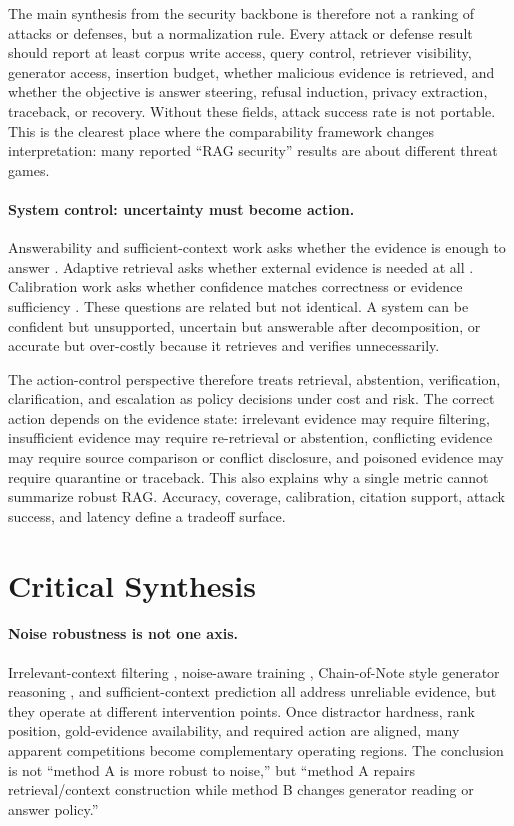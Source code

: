 \documentclass[11pt]{article}
\begin{document}
The main synthesis from the security backbone is therefore not a ranking of attacks or defenses, but a normalization rule. Every attack or defense result should report at least corpus write access, query control, retriever visibility, generator access, insertion budget, whether malicious evidence is retrieved, and whether the objective is answer steering, refusal induction, privacy extraction, traceback, or recovery. Without these fields, attack success rate is not portable. This is the clearest place where the comparability framework changes interpretation: many reported ``RAG security'' results are about different threat games.

\paragraph{System control: uncertainty must become action.}
Answerability and sufficient-context work asks whether the evidence is enough to answer \citep{sufficientContext2024}. Adaptive retrieval asks whether external evidence is needed at all \citep{selfRAG2023,crag2024}. Calibration work asks whether confidence matches correctness or evidence sufficiency \citep{calibRAG2025,uncertaintyRAG2024}. These questions are related but not identical. A system can be confident but unsupported, uncertain but answerable after decomposition, or accurate but over-costly because it retrieves and verifies unnecessarily.

The action-control perspective therefore treats retrieval, abstention, verification, clarification, and escalation as policy decisions under cost and risk. The correct action depends on the evidence state: irrelevant evidence may require filtering, insufficient evidence may require re-retrieval or abstention, conflicting evidence may require source comparison or conflict disclosure, and poisoned evidence may require quarantine or traceback. This also explains why a single metric cannot summarize robust RAG. Accuracy, coverage, calibration, citation support, attack success, and latency define a tradeoff surface.

\section{Critical Synthesis}
\label{sec:crosscutting}



\paragraph{Noise robustness is not one axis.}
Irrelevant-context filtering \citep{irrelevantContext2023}, noise-aware training \citep{raat2024}, Chain-of-Note style generator reasoning \citep{chainOfNote2023}, and sufficient-context prediction \citep{sufficientContext2024} all address unreliable evidence, but they operate at different intervention points. Once distractor hardness, rank position, gold-evidence availability, and required action are aligned, many apparent competitions become complementary operating regions. The conclusion is not ``method A is more robust to noise,'' but ``method A repairs retrieval/context construction while method B changes generator reading or answer policy.''
\end{document}
